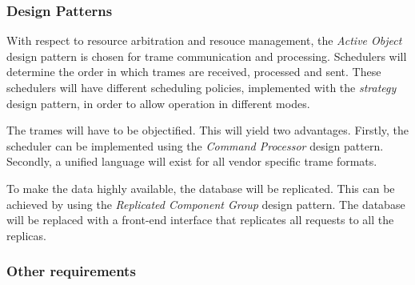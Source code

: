 \subsubsection{Design Patterns}
\label{dp:whole-system}

\npar With respect to resource arbitration and resouce management, the
\emph{Active Object} design pattern is chosen for trame communication and
processing. Schedulers will determine the order in which trames are received,
processed and sent. These schedulers will have different scheduling policies,
implemented with the \emph{strategy} design pattern, in order to allow operation
in different modes.

\npar The trames will have to be objectified. This will yield two advantages.
Firstly, the scheduler can be implemented using the \emph{Command Processor}
design pattern. Secondly, a unified language will exist for all vendor
specific trame formats.

\npar To make the data highly available, the database will be replicated. This
can be achieved by using the \emph{Replicated Component Group} design pattern.
The database will be replaced with a front-end interface that replicates all
requests to all the replicas. 

\subsubsection{Other requirements}
\label{others:whole-system}


